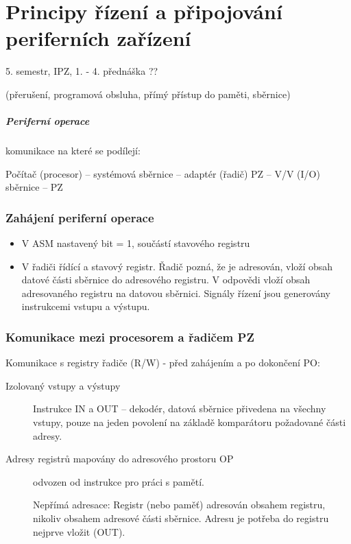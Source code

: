 \documentclass[a4wide]{report}
\begin{document}
\chapter{Principy řízení a připojování periferních zařízení} \label{cha:6}

5. semestr, IPZ, 1. - 4. přednáška ??

(přerušení, programová obsluha, přímý přístup do paměti, sběrnice)

\paragraph{Periferní operace} komunikace na které se podílejí:

Počítač (procesor) -- systémová sběrnice -- adaptér (řadič) PZ -- V/V (I/O) sběrnice -- PZ

\subsection{Zahájení periferní operace}

\begin{itemize}
	\item V ASM nastavený bit  = 1, součástí stavového registru
	\item V řadiči řídící a stavový registr. Řadič pozná, že je adresován, vloží obsah datové části sběrnice do adresového registru. V odpovědi vloží obsah adresovaného registru na datovou sběrnici. Signály řízení jsou generovány instrukcemi vstupu a výstupu.
\end{itemize}

\subsection{Komunikace mezi procesorem a  řadičem PZ}

Komunikace s registry řadiče (R/W) - před zahájením a po dokončení PO:
\begin{description}
	\item[Izolovaný vstupy a výstupy] Instrukce IN a OUT -- dekodér, datová sběrnice přivedena na všechny vstupy, pouze na jeden povolení na základě komparátoru požadované části adresy. 
	\item[Adresy registrů mapovány do adresového prostoru OP]  odvozen od instrukce pro práci s pamětí.
	
	Nepřímá adresace: Registr (nebo paměť) adresován obsahem registru, nikoliv obsahem adresové části sběrnice. Adresu je potřeba do registru nejprve vložit (OUT).
\end{description}
\end{document}
